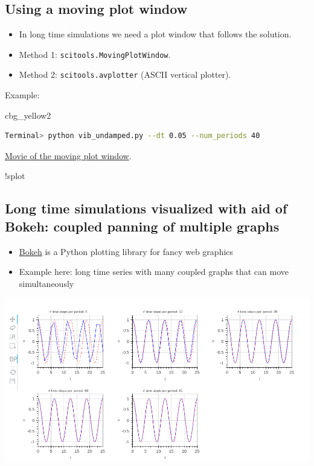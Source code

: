 \documentclass[%
oneside,                 %
final,                   %
10pt]{article}
\newenvironment{_cod_tight}[1]{
   \def\FrameCommand{\colorbox{#1}}
   \FrameRule0.6pt\MakeFramed {\FrameRestore}\vskip3mm}
   {\vskip0mm\endMakeFramed}
\newenvironment{cod}[1]{
\bgroup\rmfamily
\fboxsep=0mm\relax
\begin{_cod_tight}{#1}
\list{}{\parsep=-2mm\parskip=0mm\topsep=0pt\leftmargin=2mm
\rightmargin=2\leftmargin\leftmargin=4pt\relax}
\item\relax}
{\endlist\end{_cod_tight}\egroup}
\begin{document}
\noindent
\subsection*{Using a moving plot window}

\begin{itemize}
 \item In long time simulations we need a plot window that follows
   the solution.

 \item Method 1: \texttt{scitools.MovingPlotWindow}.

 \item Method 2: \texttt{scitools.avplotter} (ASCII vertical plotter).
\end{itemize}

\noindent
Example:
\begin{cod}{cbg_yellow2}\begin{lstlisting}[language=bash,style=simple,xleftmargin=2mm]
Terminal> python vib_undamped.py --dt 0.05 --num_periods 40
\end{lstlisting}\end{cod}
\noindent

\href{{http://tinyurl.com/opdfafk/pub/mov-vib/vib_undamped_dt0.05/index.html}}{Movie of the moving plot window}.

!splot
\subsection*{Long time simulations visualized with aid of Bokeh: coupled panning of multiple graphs}

\begin{itemize}
 \item \href{{http://bokeh.pydata.org/en/latest/docs/quickstart.html}}{Bokeh} is a
   Python plotting library for fancy web graphics

 \item Example here: long time series with many coupled graphs that can move
   simultaneously
\end{itemize}

\noindent
\centerline{\includegraphics[width=1.0\linewidth]{fig-vib/bokeh_gridplot1.png}}
\end{document}
